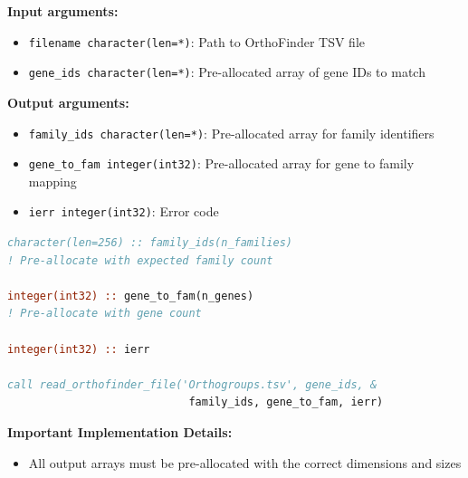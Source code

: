 \begin{enumerate}
\begin{enumerate}
\begin{itemize}
                          \textbf{Input arguments:}
                          \begin{itemize}
                            \item \texttt{filename character(len=*)}: Path to OrthoFinder TSV
                                  file
                                  
                            \item \texttt{gene\_ids character(len=*)}: Pre-allocated array of
                                  gene IDs to match
                          \end{itemize}
                          \textbf{Output arguments:}
                          \begin{itemize}
                            \item \texttt{family\_ids character(len=*)}: Pre-allocated array
                                  for family identifiers
                                  
                            \item \texttt{gene\_to\_fam integer(int32)}: Pre-allocated array
                                  for gene to family mapping
                                  
                            \item \texttt{ierr integer(int32)}: Error code
                          \end{itemize}
                          \begin{lstlisting}[language=Fortran, caption={Read OrthoFinder Family Mapping}]
character(len=256) :: family_ids(n_families)  
! Pre-allocate with expected family count

integer(int32) :: gene_to_fam(n_genes)     
! Pre-allocate with gene count

integer(int32) :: ierr

call read_orthofinder_file('Orthogroups.tsv', gene_ids, &
                            family_ids, gene_to_fam, ierr)
                          \end{lstlisting}
                          
                          \textbf{Important Implementation Details:}
                          \begin{itemize}
                            \item All output arrays must be pre-allocated with the correct dimensions
                                  and sizes
                                  

\end{itemize}
\end{itemize}
\end{enumerate}
\end{enumerate}
